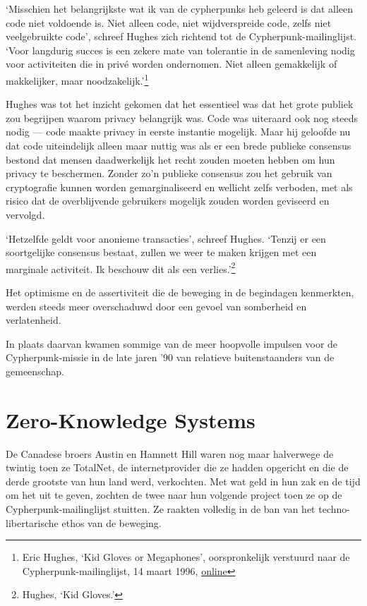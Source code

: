 \documentclass[smalldemyvopaper,11pt,twoside,onecolumn,openright,extrafontsizes,hidelinks]{memoir}
\begin{document}
`Misschien het belangrijkste wat ik van de cypherpunks heb geleerd is
dat alleen code niet voldoende is. Niet alleen code, niet wijdverspreide
code, zelfs niet veelgebruikte code', schreef Hughes zich richtend tot
de Cypherpunk-mailinglijst. `Voor langdurig succes is een zekere mate
van tolerantie in de samenleving nodig voor activiteiten die in privé
worden ondernomen. Niet alleen gemakkelijk of makkelijker, maar
noodzakelijk.'\footnote{Eric Hughes, `Kid Gloves or Megaphones',
  oorspronkelijk verstuurd naar de Cypherpunk-mailinglijst, 14 maart
  1996,
  \href{https://cypherpunks.venona.com/date/1996/03/msg00932.html}{online}}

Hughes was tot het inzicht gekomen dat het essentieel was dat het grote
publiek zou begrijpen waarom privacy belangrijk was. Code was uiteraard
ook nog steeds nodig --- code maakte privacy in eerste instantie
mogelijk. Maar hij geloofde nu dat code uiteindelijk alleen maar nuttig
was als er een brede publieke consensus bestond dat mensen daadwerkelijk
het recht zouden moeten hebben om hun privacy te beschermen. Zonder zo'n
publieke consensus zou het gebruik van cryptografie kunnen worden
gemarginaliseerd en wellicht zelfs verboden, met als risico dat de
overblijvende gebruikers mogelijk zouden worden geviseerd en vervolgd.

`Hetzelfde geldt voor anonieme transacties', schreef Hughes. `Tenzij er
een soortgelijke consensus bestaat, zullen we weer te maken krijgen met
een marginale activiteit. Ik beschouw dit als een verlies.'\footnote{Hughes,
  `Kid Gloves.'}

Het optimisme en de assertiviteit die de beweging in de begindagen
kenmerkten, werden steeds meer overschaduwd door een gevoel van
somberheid en verlatenheid.

In plaats daarvan kwamen sommige van de meer hoopvolle impulsen voor de
Cypherpunk-missie in de late jaren '90 van relatieve buitenstaanders van
de gemeenschap.

\section{Zero-Knowledge Systems}\label{zero-knowledge-systems}

De Canadese broers Austin en Hamnett Hill waren nog maar halverwege de
twintig toen ze TotalNet, de internetprovider die ze hadden opgericht en
die de derde grootste van hun land werd, verkochten. Met wat geld in hun
zak en de tijd om het uit te geven, zochten de twee naar hun volgende
project toen ze op de Cypherpunk-mailinglijst stuitten. Ze raakten
volledig in de ban van het techno-libertarische ethos van de beweging.
\end{document}
